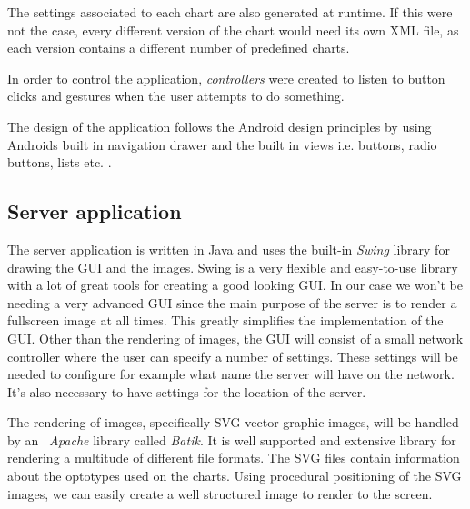 \documentclass[12pt,a4paper,notitlepage]{report}
\begin{document}
The settings associated to each chart are also generated at runtime. If this were not the case, every different version of the chart would need its own XML file, as each version contains a different number of predefined charts.

In order to control the application, \textit{controllers} were created to listen to button clicks and gestures when the user attempts to do something.

The design of the application follows the Android design principles by using Androids built in navigation drawer and the built in views i.e. buttons, radio buttons, lists etc. \cite{android_design}.

\subsection{Server application}
The server application is written in Java and uses the built-in \textit{Swing} library for drawing the GUI and the images. Swing is a very flexible and easy-to-use library with a lot of great tools for creating a good looking GUI. In our case
we won't be needing a very advanced GUI since the main purpose of the server is to render a fullscreen image at all times. This greatly simplifies the implementation of the GUI. Other than the rendering of images, the GUI will consist of a small network controller where the user can specify a number of settings. These settings will be needed to configure for example what name the server will have on the network. It's also necessary to have settings for the location of the server.

The rendering of images, specifically SVG vector graphic images, will be handled by an \textit{~Apache} library called \textit{Batik}. It is well supported and extensive library for rendering a multitude of different file formats. The SVG files contain information about the optotypes used on the charts. Using procedural positioning of the SVG images, we can easily create a well structured image to render to the screen.

\end{document}
